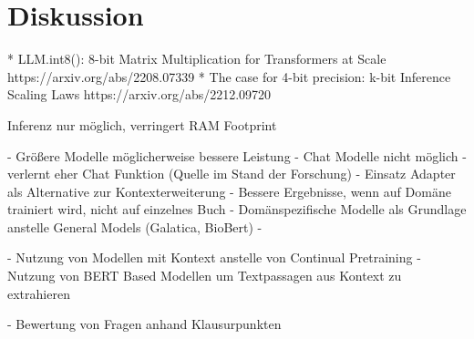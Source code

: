 \chapter{Diskussion}\label{ch:discussion}

* LLM.int8(): 8-bit Matrix Multiplication for Transformers at Scale https://arxiv.org/abs/2208.07339
* The case for 4-bit precision: k-bit Inference Scaling Laws https://arxiv.org/abs/2212.09720

Inferenz nur möglich, verringert RAM Footprint

- Größere Modelle möglicherweise bessere Leistung
- Chat Modelle nicht möglich - verlernt eher Chat Funktion (Quelle im Stand der Forschung)
- Einsatz Adapter als Alternative zur Kontexterweiterung
- Bessere Ergebnisse, wenn auf Domäne trainiert wird, nicht auf einzelnes Buch
- Domänspezifische Modelle als Grundlage anstelle General Models (Galatica, BioBert)
- 

- Nutzung von Modellen mit Kontext anstelle von Continual Pretraining
- Nutzung von BERT Based Modellen um Textpassagen aus Kontext zu extrahieren

- Bewertung von Fragen anhand Klausurpunkten